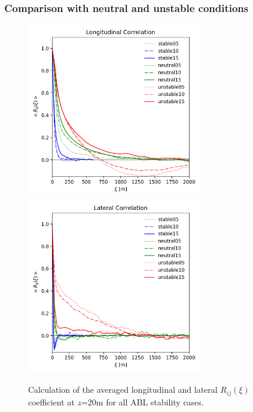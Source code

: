 \subsubsection{Comparison with neutral and unstable conditions}


\begin{figure}[hbt!]
  \label{fig:AllStabilityRij}
  \centering
  \includegraphics[width=3in]{figures/AllStability_Rij_Longitudinal.png}
  \includegraphics[width=3in]{figures/AllStability_Rij_Lateral.png}
  \caption{Calculation of the averaged longitudinal and lateral
    $R_{ij}(\xi)$ coefficient at $z$=20m for all ABL stability cases.}
\end{figure}
